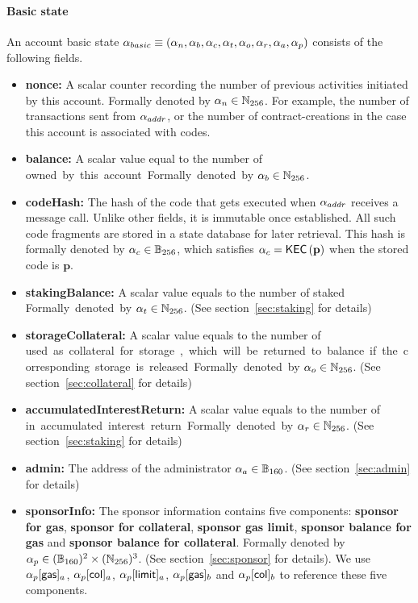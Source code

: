 \paragraph{Basic state}

An account basic state $\mathbf{\alpha}_{basic} \equiv\left( \mathbf{\alpha}_n, \mathbf{\alpha}_b, \mathbf{\alpha}_c,\mathbf{\alpha}_t, \mathbf{\alpha}_o, \mathbf{\alpha}_r, \mathbf{\alpha}_a, \mathbf{\alpha}_p\right)$ consists of the following fields. 
\begin{itemize}[nosep]
	\item {\bf nonce:} A scalar counter recording the number of previous activities initiated by this account. Formally denoted by $\mathbf{\alpha}_n\in \mathbb{N}_{256}$. For example, the number of transactions sent from $\mathbf{\alpha}_{addr}$, or the number of contract-creations in the case this account is associated with codes.

	\item {\bf balance:} A scalar value equal to the number of \unit  owned by this account. Formally denoted by $\mathbf{\alpha}_b\in \mathbb{N}_{256}$. 

	\item {\bf codeHash:} The hash of the \cvm code that gets executed when $\mathbf{\alpha}_{addr}$ receives a message call. 
	Unlike other fields, it is immutable once established. All such code fragments are stored in a state database for later retrieval. This hash is formally denoted by $\mathbf{\alpha}_c\in \mathbb{B}_{256}$,
	which satisfies $\mathbf{\alpha}_c=\mathsf{KEC}\left(\mathbf{p} \right)$ when the stored code is $\mathbf{p}$.  

	\item {\bf stakingBalance:} A scalar value equals to the number of staked \unit. Formally denoted by $\mathbf{\alpha}_t\in \mathbb{N}_{256}$. (See section~\ref{sec:staking} for details)
	
	\item {\bf storageCollateral:} A scalar value equals to the number of \unit used as collateral for storage, which will be returned to balance if the corresponding storage is released. Formally denoted by $\mathbf{\alpha}_o\in \mathbb{N}_{256}$. (See section~\ref{sec:collateral} for details)
	
	\item {\bf accumulatedInterestReturn:} A scalar value equals to the number of \unit in accumulated interest return. Formally denoted by $\mathbf{\alpha}_r\in \mathbb{N}_{256}$. (See section~\ref{sec:staking} for details)
	
	\item {\bf admin:} The address of the administrator $\mathbf{\alpha}_a\in \mathbb{B}_{160}$. (See section~\ref{sec:admin} for details)
	
	\item {\bf sponsorInfo:} The sponsor information contains five components: {\bf sponsor for gas}, {\bf sponsor for collateral}, {\bf sponsor gas limit}, {\bf sponsor balance for gas} and {\bf sponsor balance for collateral}. Formally denoted by $\mathbf{\alpha}_p\in (\mathbb{B}_{160})^2\times (\mathbb{N}_{256})^3$. (See section~\ref{sec:sponsor} for details). We use $\mathbf{\alpha}_p[{\sf gas}]_a$, $\mathbf{\alpha}_p[{\sf col}]_a$, 
	$\mathbf{\alpha}_p[{\sf limit}]_a$, $\mathbf{\alpha}_p[{\sf gas}]_b$ and $\mathbf{\alpha}_p[{\sf col}]_b$ to reference these five components. 
\end{itemize}

